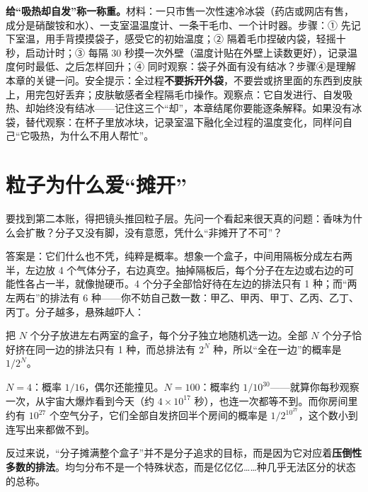 \begin{shiyan}
\textbf{给“吸热却自发”称一称重。}材料：一只市售一次性速冷冰袋（药店或网店有售，成分是硝酸铵和水）、一支室温温度计、一条干毛巾、一个计时器。步骤：① 先记下室温，用手背摸摸袋子，感受它的初始温度；② 隔着毛巾捏破内袋，轻摇十秒，启动计时；③ 每隔 30 秒摸一次外壁（温度计贴在外壁上读数更好），记录温度何时最低、之后怎样回升；④ 同时观察：袋子外面有没有结冰？步骤④是理解本章的关键一问。安全提示：全过程\textbf{不要拆开外袋}，不要尝或挤里面的东西到皮肤上，用完包好丢弃；皮肤敏感者全程隔毛巾操作。观察点：它自发进行、自发吸热、却始终没有结冰——记住这三个“却”，本章结尾你要能逐条解释。如果没有冰袋，替代观察：在杯子里放冰块，记录室温下融化全过程的温度变化，同样问自己“它吸热，为什么不用人帮忙”。
\end{shiyan}

\section{粒子为什么爱“摊开”}

要找到第二本账，得把镜头推回粒子层。先问一个看起来很天真的问题：香味为什么会扩散？分子又没有脚，没有意愿，凭什么“非摊开了不可”？

答案是：它们什么也不凭，纯粹是概率。想象一个盒子，中间用隔板分成左右两半，左边放 4 个气体分子，右边真空。抽掉隔板后，每个分子在左边或右边的可能性各占一半，就像抛硬币。4 个分子全部恰好待在左边的排法只有 1 种；而“两左两右”的排法有 6 种——你不妨自己数一数：甲乙、甲丙、甲丁、乙丙、乙丁、丙丁。分子越多，悬殊越吓人：

\begin{qiaoliang}
把 $N$ 个分子放进左右两室的盒子，每个分子独立地随机选一边。全部 $N$ 个分子恰好挤在同一边的排法只有 1 种，而总排法有 $2^N$ 种，所以“全在一边”的概率是 $1/2^N$。

$N=4$：概率 $1/16$，偶尔还能撞见。$N=100$：概率约 $1/10^{30}$——就算你每秒观察一次，从宇宙大爆炸看到今天（约 $4\times10^{17}$ 秒），也连一次都等不到。而你房间里约有 $10^{27}$ 个空气分子，它们全部自发挤回半个房间的概率是 $1/2^{10^{27}}$，这个数小到连写出来都做不到。

反过来说，“分子摊满整个盒子”并不是分子追求的目标，而是因为它对应着\textbf{压倒性多数的排法}。均匀分布不是一个特殊状态，而是亿亿亿……种几乎无法区分的状态的总称。
\end{qiaoliang}

\begin{center}
\end{center}

